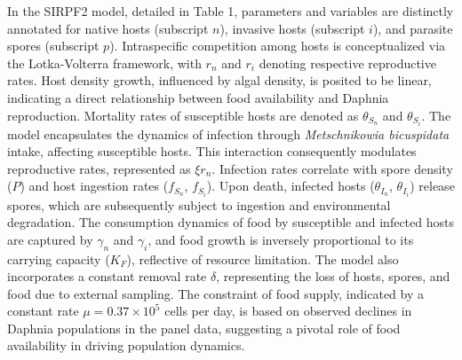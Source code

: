 \documentclass[12pt]{article}
\begin{document}
In the SIRPF2 model, detailed in Table 1, parameters and variables are distinctly annotated for native hosts (subscript $n$), invasive hosts (subscript $i$), and parasite spores (subscript $p$). Intraspecific competition among hosts is conceptualized via the Lotka-Volterra framework, with $r_n$ and $r_i$ denoting respective reproductive rates. Host density growth, influenced by algal density, is posited to be linear, indicating a direct relationship between food availability and Daphnia reproduction. Mortality rates of susceptible hosts are denoted as $\theta_{S_n}$ and $\theta_{S_i}$. The model encapsulates the dynamics of infection through \textit{Metschnikowia bicuspidata} intake, affecting susceptible hosts. This interaction consequently modulates reproductive rates, represented as $\xi r_n$. Infection rates correlate with spore density ($P$) and host ingestion rates ($f_{S_n}$, $f_{S_i}$). Upon death, infected hosts ($\theta_{I_n}$, $\theta_{I_i}$) release spores, which are subsequently subject to ingestion and environmental degradation. The consumption dynamics of food by susceptible and infected hosts are captured by $\gamma_n$ and $\gamma_i$, and food growth is inversely proportional to its carrying capacity ($K_F$), reflective of resource limitation. The model also incorporates a constant removal rate $\delta$, representing the loss of hosts, spores, and food due to external sampling. The constraint of food supply, indicated by a constant rate $\mu = 0.37 \times 10^5$ cells per day, is based on observed declines in Daphnia populations in the panel data, suggesting a pivotal role of food availability in driving population dynamics.\\
\end{document}
